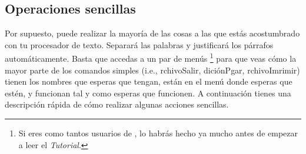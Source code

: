 \subsection{Operaciones sencillas}

Por supuesto, \LyX{} puede realizar la mayoría de las cosas a las
que estás acostumbrado con tu procesador de texto. Separará las palabras
y justificará los párrafos automáticamente. Basta que accedas a un
par de menús%
\footnote{Si eres como tantos usuarios de , lo habrás hecho ya
mucho antes de empezar a leer el \emph{Tutorial}.%
} para que veas cómo la mayor parte de los comandos simples (i.e.,
\textsf{}\textsf{rchivo\lyxarrow{}Salir,} \textsf{}\textsf{dición\lyxarrow{}P}\textsf{}\textsf{gar,}
\textsf{}\textsf{rchivo\lyxarrow{}Im}\textsf{}\textsf{rimir)}
tienen los nombres que esperas que tengan, están en el menú donde
esperas que estén, y funcionan tal y como esperas que funcionen. A
continuación tienes una descripción rápida de cómo realizar algunas
acciones sencillas.

